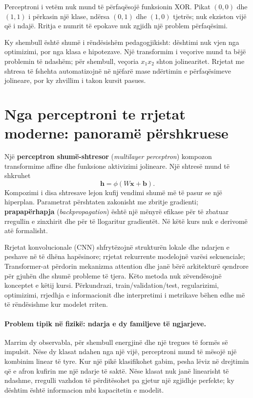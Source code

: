 \documentclass[12pt,a4paper,oneside]{book}
\newcommand{\term}[2]{\textbf{#1} (\textit{#2})}
\begin{document}
Perceptroni i vetëm nuk mund të përfaqësojë funksionin XOR. Pikat $(0,0)$ dhe $(1,1)$ i përkasin një klase, ndërsa $(0,1)$ dhe $(1,0)$ tjetrës; nuk ekziston vijë që i ndajë. Rritja e numrit të epokave nuk zgjidh një problem përfaqësimi.

Ky shembull është shumë i rëndësishëm pedagogjikisht: dështimi nuk vjen nga optimizimi, por nga klasa e hipotezave. Një transformim i veçorive mund ta bëjë problemin të ndashëm; për shembull, veçoria $x_1x_2$ shton jolinearitet. Rrjetat me shtresa të fshehta automatizojnë në njëfarë mase ndërtimin e përfaqësimeve jolineare, por ky zhvillim i takon kursit pasues.

\section{Nga perceptroni te rrjetat moderne: panoramë përshkruese}

Një \term{perceptron shumë-shtresor}{multilayer perceptron} kompozon transformime affine dhe funksione aktivizimi jolineare. Një shtresë mund të shkruhet
\[
\mathbf h=\phi(W\mathbf x+\mathbf b).
\]
Kompozimi i disa shtresave lejon kufij vendimi shumë më të pasur se një hiperplan. Parametrat përshtaten zakonisht me zbritje gradienti; \term{prapapërhapja}{backpropagation} është një mënyrë efikase për të zbatuar rregullin e zinxhirit dhe për të llogaritur gradientët. Në këtë kurs nuk e derivomë atë formalisht.

Rrjetat konvolucionale (CNN) shfrytëzojnë strukturën lokale dhe ndarjen e peshave në të dhëna hapësinore; rrjetat rekurrente modelojnë varësi sekuenciale; Transformer-at përdorin mekanizma attention dhe janë bërë arkitekturë qendrore për gjuhën dhe shumë probleme të tjera. Këto metoda nuk zëvendësojnë konceptet e këtij kursi. Përkundrazi, train/validation/test, regularizimi, optimizimi, rrjedhja e informacionit dhe interpretimi i metrikave bëhen edhe më të rëndësishme kur modelet rriten.


\paragraph{Problem tipik në fizikë: ndarja e dy familjeve të ngjarjeve.}
Marrim dy observabla, për shembull energjinë dhe një tregues të formës së impulsit. Nëse dy klasat ndahen nga një vijë, perceptroni mund të mësojë një kombinim linear të tyre. Kur një pikë klasifikohet gabim, pesha lëviz në drejtimin që e afron kufirin me një ndarje të saktë. Nëse klasat nuk janë linearisht të ndashme, rregulli vazhdon të përditësohet pa gjetur një zgjidhje perfekte; ky dështim është informacion mbi kapacitetin e modelit.
\end{document}
